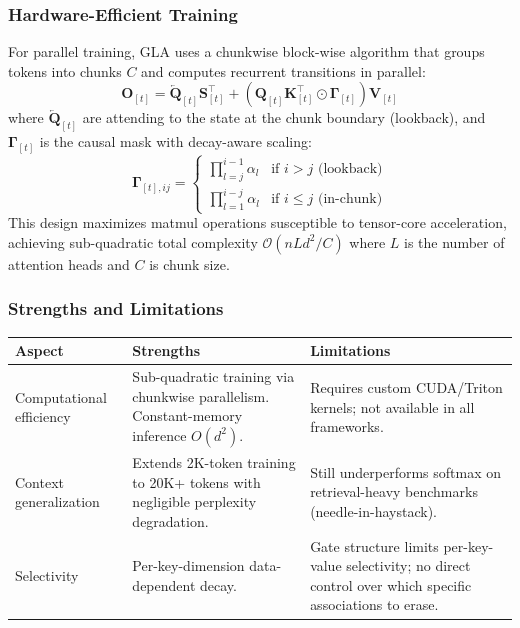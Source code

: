 \subsubsection{Hardware-Efficient Training}

For parallel training, GLA uses a chunkwise block-wise algorithm that groups tokens into chunks $C$ and computes recurrent transitions in parallel:
\[
\mathbf{O}_{[t]} = \overleftarrow{\mathbf{Q}}_{[t]} \mathbf{S}_{[t]}^\top + \left(\mathbf{Q}_{[t]} \mathbf{K}_{[t]}^\top \odot \mathbf{\Gamma}_{[t]}\right) \mathbf{V}_{[t]}
\]
where $\overleftarrow{\mathbf{Q}}_{[t]}$ are attending to the state at the chunk boundary (lookback), and $\mathbf{\Gamma}_{[t]}$ is the causal mask with decay-aware scaling:
\[
\mathbf{\Gamma}_{[t],ij} = \begin{cases} \prod_{l=j}^{i-1} \alpha_l & \text{if } i > j \text{ (lookback)} \\ \prod_{l=1}^{i-j} \alpha_l & \text{if } i \le j \text{ (in-chunk)} \end{cases}
\]
This design maximizes matmul operations susceptible to tensor-core acceleration, achieving sub-quadratic total complexity $\mathcal{O}(nLd^2/C)$ where $L$ is the number of attention heads and $C$ is chunk size.

\subsubsection{Strengths and Limitations}

\begin{table}[H]
\centering
\small
\begin{tabularx}{0.95\linewidth}{Xp{4cm}p{4cm}}
\toprule
\textbf{Aspect} & \textbf{Strengths} & \textbf{Limitations} \\
\midrule
Computational efficiency & Sub-quadratic training via chunkwise parallelism. Constant-memory inference $O(d^2)$. & Requires custom CUDA/Triton kernels; not available in all frameworks. \\
Context generalization & Extends 2K-token training to 20K+ tokens with negligible perplexity degradation. & Still underperforms softmax on retrieval-heavy benchmarks (needle-in-haystack). \\
Selectivity & Per-key-dimension data-dependent decay. & Gate structure limits per-key-value selectivity; no direct control over which specific associations to erase. \\
\bottomrule
\end{tabularx}
\end{table}

